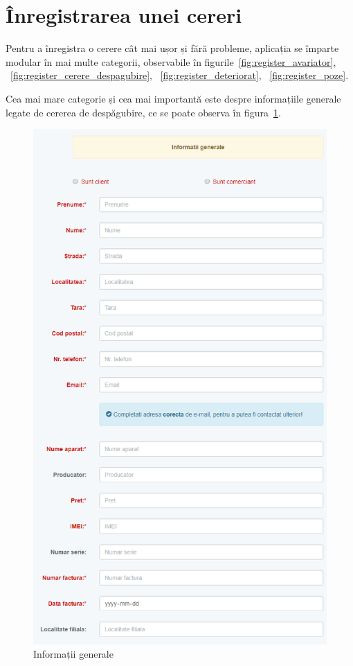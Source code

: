 \section{Înregistrarea unei cereri}

	Pentru a înregistra o cerere cât mai ușor și fără probleme, aplicația se împarte modular în mai multe categorii, observabile în figurile~\ref{fig:register_avariator}, ~\ref{fig:register_cerere_despagubire}, ~\ref{fig:register_deteriorat}, ~\ref{fig:register_poze}.

	Cea mai mare categorie și cea mai importantă este despre informațiile generale legate de cererea de despăgubire, ce se poate observa în figura~\ref{fig:register_informatii_generale}.

	\begin{figure}
		\includegraphics[width=0.9\linewidth]{../imagini/register_informatii_generale.png}
		\caption{Informații generale}
		\label{fig:register_informatii_generale}
	\end{figure}

